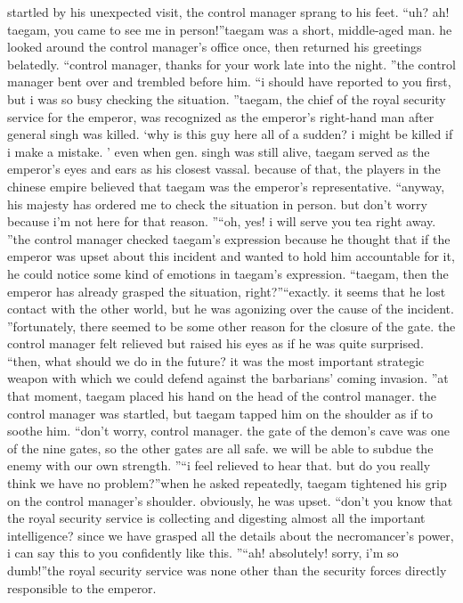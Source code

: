  startled by his unexpected visit, the control manager sprang to his feet.
“uh? ah! taegam, you came to see me in person!”taegam was a short, middle-aged man.
 he looked around the control manager’s office once, then returned his greetings belatedly.
“control manager, thanks for your work late into the night.
”the control manager bent over and trembled before him.
“i should have reported to you first, but i was so busy checking the situation.
”taegam, the chief of the royal security service for the emperor, was recognized as the emperor’s right-hand man after general singh was killed.
‘why is this guy here all of a sudden? i might be killed if i make a mistake.
’
even when gen.
 singh was still alive, taegam served as the emperor’s eyes and ears as his closest vassal.
 because of that, the players in the chinese empire believed that taegam was the emperor’s representative.
“anyway, his majesty has ordered me to check the situation in person.
 but don’t worry because i’m not here for that reason.
”“oh, yes! i will serve you tea right away.
”the control manager checked taegam’s expression because he thought that if the emperor was upset about this incident and wanted to hold him accountable for it, he could notice some kind of emotions in taegam’s expression.
“taegam, then the emperor has already grasped the situation, right?”“exactly.
 it seems that he lost contact with the other world, but he was agonizing over the cause of the incident.
”fortunately, there seemed to be some other reason for the closure of the gate.
the control manager felt relieved but raised his eyes as if he was quite surprised.
“then, what should we do in the future? it was the most important strategic weapon with which we could defend against the barbarians’ coming invasion.
”at that moment, taegam placed his hand on the head of the control manager.
the control manager was startled, but taegam tapped him on the shoulder as if to soothe him.
“don’t worry, control manager.
 the gate of the demon’s cave was one of the nine gates, so the other gates are all safe.
 we will be able to subdue the enemy with our own strength.
”“i feel relieved to hear that.
 but do you really think we have no problem?”when he asked repeatedly, taegam tightened his grip on the control manager’s shoulder.
obviously, he was upset.
“don’t you know that the royal security service is collecting and digesting almost all the important intelligence? since we have grasped all the details about the necromancer’s power, i can say this to you confidently like this.
”“ah! absolutely! sorry, i’m so dumb!”the royal security service was none other than the security forces directly responsible to the emperor.
